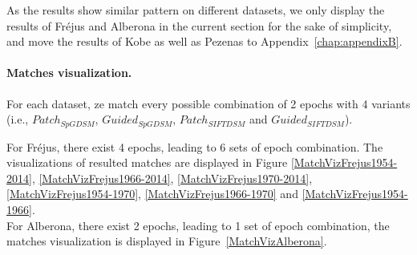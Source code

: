 As the results show similar pattern on different datasets, we only display the results of Fr{\'e}jus and Alberona in the current section for the sake of simplicity, and move the results of Kobe as well as Pezenas to Appendix~\ref{chap:appendixB}.\\

\paragraph{Matches visualization.}
\label{matchVizMainBody}
For each dataset, ze match every possible combination of 2 epochs with 4 variants (i.e.,  $Patch_{SpGDSM}$,  $Guided_{SpGDSM}$,  $Patch_{SIFTDSM}$ and  $Guided_{SIFTDSM}$). 

For Fr{\'e}jus, there exist 4 epochs, leading to 6 sets of epoch combination. The visualizations of resulted matches are displayed in Figure \ref{MatchVizFrejus1954-2014}, \ref{MatchVizFrejus1966-2014}, \ref{MatchVizFrejus1970-2014}, \ref{MatchVizFrejus1954-1970}, \ref{MatchVizFrejus1966-1970} and \ref{MatchVizFrejus1954-1966}.\\
For Alberona, there exist 2 epochs, leading to 1 set of epoch combination, the matches visualization is displayed in Figure~\ref{MatchVizAlberona}.\\


